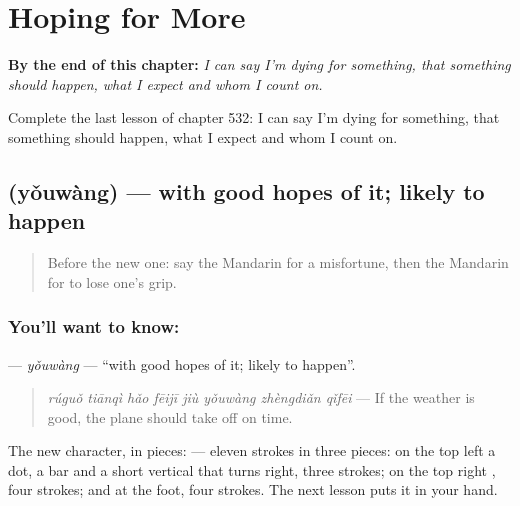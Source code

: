 
\chapter{Hoping for More}
\label{ch:zh-hoping-for-more}

\begin{chapteropening}
\textbf{By the end of this chapter:} \emph{I can say I'm dying for something, that something should happen, what I expect and whom I count on.}

Complete the last lesson of chapter 532: I can say I'm dying for something, that something should happen, what I expect and whom I count on.
\end{chapteropening}

\section[\texorpdfstring{\zh{有望} (yǒuwàng)}{有望 (yǒuwàng)}]{ (yǒuwàng) — with good hopes of it; likely to happen}

\label{lesson:ZH-C532-youwang}



\begin{quote}
Before the new one: say the Mandarin for a misfortune, then the Mandarin for to lose one's grip.
\end{quote}

\subsection*{You'll want to know: }
\textbf{} — \emph{yǒuwàng} — \textquotedblleft{}with good hopes of it; likely to happen\textquotedblright{}.

\begin{quote}
\textbf{} \emph{rúguǒ tiānqì hǎo fēijī jiù yǒuwàng zhèngdiǎn qǐfēi} — If the weather is good, the plane should take off on time.
\end{quote}

The new character, in pieces:  — eleven strokes in three pieces: on the top left a dot, a bar and a short vertical that turns right, three strokes; on the top right , four strokes; and  at the foot, four strokes. The next lesson puts it in your hand.


